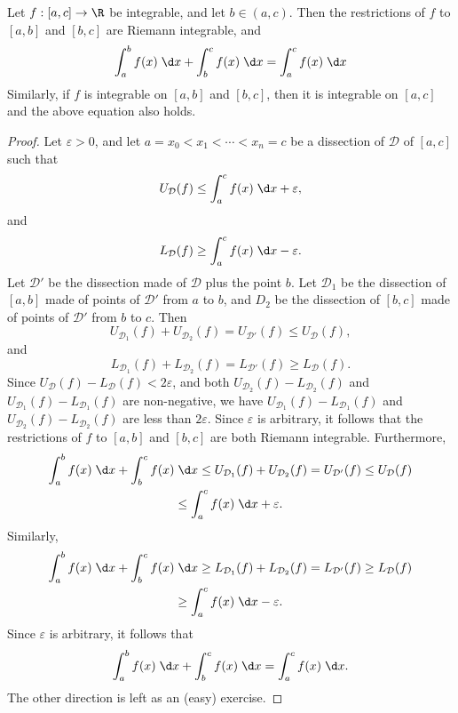 \documentclass[a4paper]{article}
\begin{document}
\begin{prop}
  Let $f: [a, c] \to \R$ be integrable, and let $b\in (a, c)$. Then the restrictions of $f$ to $[a, b]$ and $[b, c]$ are Riemann integrable, and
  \[
    \int_a^b f(x)\;\d x + \int_b^c f(x)\;\d x = \int_a^c f(x) \;\d x
  \]
  Similarly, if $f$ is integrable on $[a, b]$ and $[b, c]$, then it is integrable on $[a, c]$ and the above equation also holds.
\end{prop}

\begin{proof}
  Let $\varepsilon> 0$, and let $a = x_0 < x_1 < \cdots < x_n = c$ be a dissection of $\mathcal{D}$ of $[a, c]$ such that
  \[
    U_\mathcal{D}(f) \leq \int_a^c f(x)\;\d x + \varepsilon,
  \]
  and
  \[
    L_\mathcal{D}(f) \geq \int_a^c f(x)\;\d x - \varepsilon.
  \]
  Let $\mathcal{D}'$ be the dissection made of $\mathcal{D}$ plus the point $b$. Let $\mathcal{D}_1$ be the dissection of $[a, b]$ made of points of $\mathcal{D}'$ from $a$ to $b$, and $D_2$ be the dissection of $[b, c]$ made of points of $\mathcal{D}'$ from $b$ to $c$. Then
  \[
    U_{\mathcal{D}_1}(f) + U_{\mathcal{D}_2}(f) = U_{\mathcal{D}'}(f) \leq U_{\mathcal{D}}(f),
  \]
  and
  \[
    L_{\mathcal{D}_1}(f) + L_{\mathcal{D}_2}(f) = L_{\mathcal{D}'}(f) \geq L_\mathcal{D} (f).
  \]
  Since $U_\mathcal{D}(f) - L_\mathcal{D}(f) < 2\varepsilon$, and both $U_{\mathcal{D}_2}(f) - L_{\mathcal{D}_2} (f)$ and $U_{\mathcal{D}_1}(f) - L_{\mathcal{D}_1} (f)$ are non-negative, we have $U_{\mathcal{D}_1} (f) - L_{\mathcal{D}_1} (f)$ and $U_{\mathcal{D}_2}(f) - L_{\mathcal{D}_2}(f)$ are less than $2\varepsilon$. Since $\varepsilon$ is arbitrary, it follows that the restrictions of $f$ to $[a, b]$ and $[b, c]$ are both Riemann integrable. Furthermore,
  \begin{multline*}
    \int_a^b f(x)\;\d x + \int_b^c f(x)\;\d x \leq U_{\mathcal{D}_1}(f) + U_{\mathcal{D}_2}(f) = U_{\mathcal{D}'}(f) \leq U_{\mathcal{D}}(f)\\
    \leq \int_a^c f(x)\;\d x + \varepsilon.
  \end{multline*}
  Similarly,
  \begin{multline*}
    \int_a^bf(x)\;\d x + \int_b^cf(x)\;\d x \geq L_{\mathcal{D}_1}(f) + L_{\mathcal{D}_2}(f) = L_{\mathcal{D}'}(f) \geq L_{\mathcal{D}}(f)\\
    \geq \int_a^c f(x)\;\d x - \varepsilon.
  \end{multline*}
  Since $\varepsilon$ is arbitrary, it follows that
  \[
    \int_a^b f(x)\;\d x + \int_b^c f(x)\;\d x = \int_a^c f(x)\;\d x.
  \]
  The other direction is left as an (easy) exercise.
\end{proof}
\end{document}
